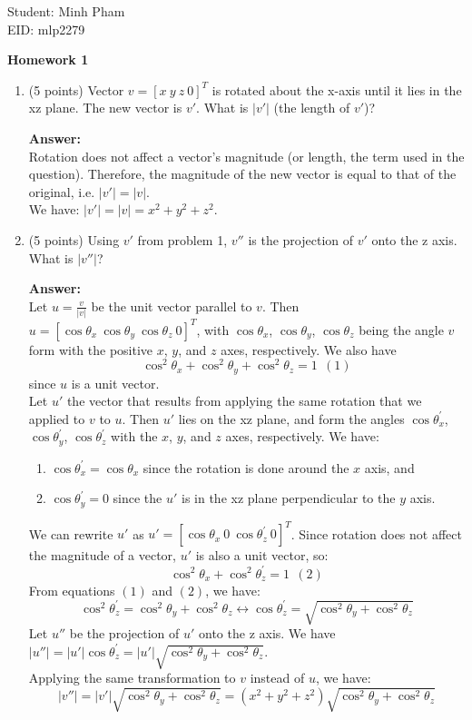 \documentclass[13pt]{letter}
\begin{document}
Student: Minh Pham \\
EID: mlp2279

\begin{center}
	\textbf{Homework 1}
\end{center}

\begin{enumerate}
	\item (5 points)
	Vector $v = [x~y~z~0]^T$ is rotated about the x-axis until it lies in the xz plane. The new vector is $v'$. What is $|v'|$ (the length of $v'$)?
	
	\textbf{Answer:} \\
	Rotation does not affect a vector's magnitude (or length, the term used in the question). Therefore, the magnitude of the new vector is equal to that of the original, i.e. $|v'| = |v|$. \\
	We have: $|v'| = |v| = x^2 + y^2 + z^2$.
	
	\vspace{13pt}

	\item (5 points)
	Using $v'$ from problem 1, $v''$ is the projection of $v'$ onto the z axis. What is $|v''|$?
	
	\textbf{Answer:} \\
	Let $u = \frac{v}{|v|}$ be the unit vector parallel to $v$. Then $u = [\cos\theta_x~\cos\theta_y~\cos\theta_z~0]^T$, with $\cos\theta_x$, $\cos\theta_y$, $\cos\theta_z$ being the angle $v$ form with the positive $x$, $y$, and $z$ axes, respectively. We also have $$\cos^2\theta_x + \cos^2\theta_y + \cos^2\theta_z = 1~~(1)$$ since $u$ is a unit vector. \\
	Let $u'$ the vector that results from applying the same rotation that we applied to $v$ to $u$. Then $u'$ lies on the xz plane, and form the angles $\cos\theta^{\prime}_x$, $\cos\theta^{\prime}_y$, $\cos\theta^{\prime}_z$ with the $x$, $y$, and $z$ axes, respectively. We have:
	\begin{enumerate}	
		\item[] $\cos\theta^{\prime}_x = \cos\theta_x$ since the rotation is done around the $x$ axis, and
		\item[] $\cos\theta^{\prime}_y = 0$ since the $u'$ is in the xz plane perpendicular to the $y$ axis.
	\end{enumerate}
	We can rewrite $u'$ as $u' = [\cos\theta_x~0~\cos\theta^{\prime}_z~0]^T$. Since rotation does not affect the magnitude of a vector, $u'$ is also a unit vector, so:
	$$\cos^2\theta_x + \cos^2\theta^{'}_z = 1~~(2)$$
	From equations $(1)$ and $(2)$, we have:
	$$\cos^2\theta^{'}_z = \cos^2\theta_y + \cos^2\theta_z
	\leftrightarrow \cos\theta^{'}_z = \sqrt{\cos^2\theta_y + \cos^2\theta_z}
	$$
	Let $u''$ be the projection of $u'$ onto the z axis. We have $|u''| = |u'|\cos\theta^{'}_z = |u'|\sqrt{\cos^2\theta_y + \cos^2\theta_z}$. \\
	Applying the same transformation to $v$ instead of $u$, we have:
	$$|v''| = |v'|\sqrt{\cos^2\theta_y + \cos^2\theta_z} = (x^2 + y^2 + z^2)\sqrt{\cos^2\theta_y + \cos^2\theta_z}$$
	

\end{enumerate}
\end{document}
